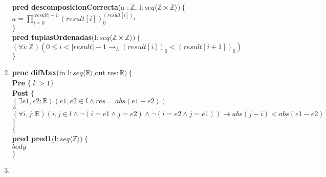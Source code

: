 \documentclass[a4paper]{article}
\begin{document}
\begin{enumerate}[label=\alph*)]
			\textbf{pred descomposicionCorrecta}(a $:\mathbb{Z}$,
			l$:seq\langle \mathbb{Z} \times \mathbb{Z}\rangle)\ 
			\{$\smallskip \\
			\hspace*{6mm}$a=\prod_{i=0}^{|result|-1}(result[i])_{0}^{(result[i])_1}$\\
			$\}$\smallskip \\	
			
			\textbf{pred tuplasOrdenadas}(l$:seq\langle \mathbb{Z} \times \mathbb{Z}
			\rangle)\ \{$\smallskip \\
			\hspace*{6mm}$(\forall i:\mathbb{Z})(0\leq i <|result|-1\rightarrow_L 
				(result[i])_0<(result[i+1])_0)$\\
			$\}$\smallskip \\	
			
		\item
			
			\textbf{proc difMax}(in l$:seq\langle \mathbb{R}\rangle$,out res$:\mathbb{R} )\ 
			\{$\smallskip \\
			\hspace*{6mm} \textbf{Pre }$\{ |l|>1\}$\smallskip \\
			\hspace*{6mm} \textbf{Post }$\{$\\
			\hspace*{6mm} $(\exists e1,e2:\mathbb{R})(e1,e2\in l \wedge res=abs(e1-e2))$\\
			\hspace*{6mm} $\wedge$\\
			\hspace*{6mm} $(\forall i,j:\mathbb{R})(i,j\in l \wedge \neg(i=e1 \wedge j=e2)
			\wedge \neg(i=e2 \wedge j=e1))\rightarrow abs(j-i)<abs(e1-e2)$\\
			\hspace*{6mm} $\}$\\
			$\{$\smallskip \\
			
			\textbf{pred pred1}(l$: seq\langle \mathbb{Z}\rangle)\ \{$\smallskip \\
			\hspace*{6mm}$body$\\
			$\}$	
			
		\item
			

\end{enumerate}
\end{document}
